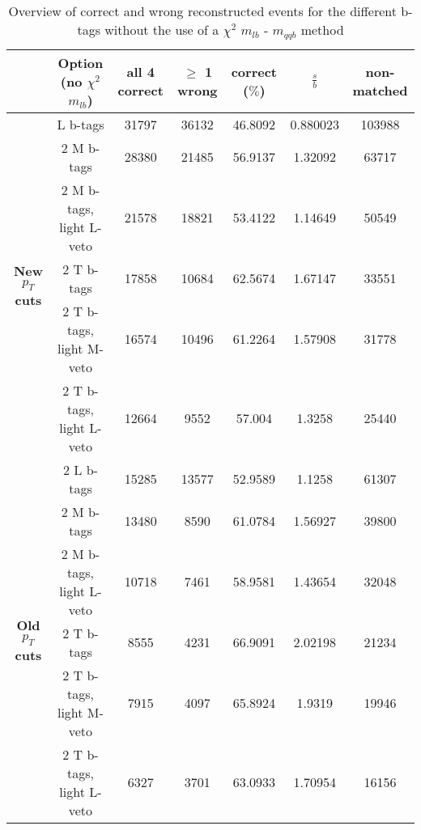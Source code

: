 \begin{landscape}
\begin{table}[!h] 
 \begin{tabular}{c|c|c|c|c|c|c} 
& \textbf{Option} (no $\chi^{2}$ $m_{lb}$) & all 4 correct & $\geq$ 1 wrong & correct ($\%$)       & $\frac{s}{b}$ & non-matched \\ \hline 
\multirow{6}{*}{\textbf{New $p_T$ cuts}} 
& L b-tags                & 31797 & 36132 & 46.8092 & 0.880023 & 103988  \\ 
&2 M b-tags               & 28380 & 21485 & 56.9137 & 1.32092  & 63717  \\ 
&2 M b-tags, light L-veto & 21578 & 18821 & 53.4122 & 1.14649  & 50549  \\ 
&2 T b-tags               & 17858 & 10684 & 62.5674 & 1.67147  & 33551  \\ 
&2 T b-tags, light M-veto & 16574 & 10496 & 61.2264 & 1.57908  & 31778  \\ 
&2 T b-tags, light L-veto & 12664 & 9552  & 57.004  & 1.3258   & 25440  \\
\hline
\multirow{6}{*}{\textbf{Old $p_T$ cuts}} 
& 2 L b-tags              & 15285 & 13577 & 52.9589 & 1.1258 & 61307  \\ 
& 2 M b-tags              & 13480 & 8590 & 61.0784 & 1.56927 & 39800  \\ 
& 2 M b-tags, light L-veto & 10718 & 7461 & 58.9581 & 1.43654 & 32048 \\ 
& 2 T b-tags              & 8555 & 4231 & 66.9091 & 2.02198 & 21234  \\ 
& 2 T b-tags, light M-veto & 7915 & 4097 & 65.8924 & 1.9319 & 19946  \\ 
& 2 T b-tags, light L-veto & 6327 & 3701 & 63.0933 & 1.70954 & 16156  \\ 
 \end{tabular} 
\caption{Overview of correct and wrong reconstructed events for the different b-tags without the use of a $\chi^{2}$ $m_{lb}$ - $m_{qqb}$ method} 
 \end{table} 
 

\end{landscape}
